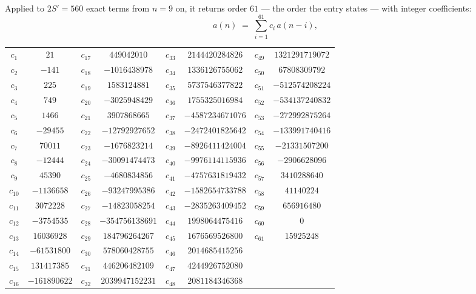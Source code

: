 \documentclass[11pt,a4paper]{article}
\theoremstyle{plain}
\theoremstyle{definition}
\begin{document}
Applied to $2S'=560$ exact terms from $n=9$ on, it returns order $61$ --- the
order the entry states --- with integer coefficients:
\[
a(n)\;=\;\sum_{i=1}^{61}c_i\,a(n-i),
\]
\begin{center}\small
\begin{tabular}{cccccccc}
$c_{1}$ & $21$ & $c_{17}$ & $449042010$ & $c_{33}$ & $2144420284826$ & $c_{49}$ & $1321291719072$ \\
$c_{2}$ & $-141$ & $c_{18}$ & $-1016438978$ & $c_{34}$ & $1336126755062$ & $c_{50}$ & $67808309792$ \\
$c_{3}$ & $225$ & $c_{19}$ & $1583124881$ & $c_{35}$ & $5737546377822$ & $c_{51}$ & $-512574208224$ \\
$c_{4}$ & $749$ & $c_{20}$ & $-3025948429$ & $c_{36}$ & $1755325016984$ & $c_{52}$ & $-534137240832$ \\
$c_{5}$ & $1466$ & $c_{21}$ & $3907868665$ & $c_{37}$ & $-4587234671076$ & $c_{53}$ & $-272992875264$ \\
$c_{6}$ & $-29455$ & $c_{22}$ & $-12792927652$ & $c_{38}$ & $-2472401825642$ & $c_{54}$ & $-133991740416$ \\
$c_{7}$ & $70011$ & $c_{23}$ & $-1676823214$ & $c_{39}$ & $-8926411424004$ & $c_{55}$ & $-21331507200$ \\
$c_{8}$ & $-12444$ & $c_{24}$ & $-30091474473$ & $c_{40}$ & $-9976114115936$ & $c_{56}$ & $-2906628096$ \\
$c_{9}$ & $45390$ & $c_{25}$ & $-4680834856$ & $c_{41}$ & $-4757631819432$ & $c_{57}$ & $3410288640$ \\
$c_{10}$ & $-1136658$ & $c_{26}$ & $-93247995386$ & $c_{42}$ & $-1582654733788$ & $c_{58}$ & $41140224$ \\
$c_{11}$ & $3072228$ & $c_{27}$ & $-14823058254$ & $c_{43}$ & $-2835263409452$ & $c_{59}$ & $656916480$ \\
$c_{12}$ & $-3754535$ & $c_{28}$ & $-354756138691$ & $c_{44}$ & $1998064475416$ & $c_{60}$ & $0$ \\
$c_{13}$ & $16036928$ & $c_{29}$ & $184796264267$ & $c_{45}$ & $1676569526800$ & $c_{61}$ & $15925248$ \\
$c_{14}$ & $-61531800$ & $c_{30}$ & $578060428755$ & $c_{46}$ & $2014685415256$ &  &  \\
$c_{15}$ & $131417385$ & $c_{31}$ & $446206482109$ & $c_{47}$ & $4244926752080$ &  &  \\
$c_{16}$ & $-161890622$ & $c_{32}$ & $2039947152231$ & $c_{48}$ & $2081184346368$ &  &  \\
\end{tabular}
\end{center}
\end{document}
